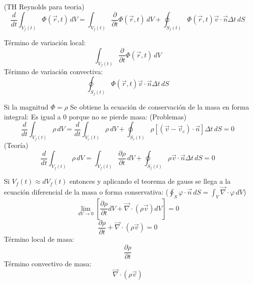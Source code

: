 (TH Reynolds para teoria)
\[\frac{d}{dt}\int_{V_f(t)} \Phi(\vec{r},t) \,dV=\int_{V_f(t)} \frac{\partial}{\partial t}\Phi(\vec{r},t) \,dV+\oint_{S_f(t)} \Phi(\vec{r},t)\vec{v}\cdot\vec{n}\Delta t \,dS\]

Término de variación local:
\[\int_{V_f(t)} \frac{\partial}{\partial t}\Phi(\vec{r},t) \,dV\]
Térimno de variación convectiva:
\[\oint_{S_f(t)} \Phi(\vec{r},t)\vec{v}\cdot\vec{n}\Delta t \,dS\]


Si la magnitud $\Phi = \rho$ Se obtiene la ecuación de conservación de la masa en forma integral:
Es igual a 0 porque no se pierde masa:
(Problemas)
\[\frac{d}{dt}\int_{V_f(t)}\rho\,dV=\frac{d}{dt}\int_{V_c(t)}\rho\,dV+\oint_{S_c(t)} \rho\left[(\vec{v}-\vec{v}_c)\cdot\vec{n}\right]\Delta t \,dS=0\]
(Teoría)
\[\frac{d}{dt}\int_{V_f(t)} \rho \,dV=\int_{V_f(t)} \frac{\partial \rho}{\partial t} \,dV+\oint_{S_f(t)} \rho\vec{v}\cdot\vec{n}\Delta t \,dS=0\]

Si $V_f(t)\approx dV_f(t)$ entonces y aplicando el teorema de gauss se llega a la ecuación diferencial de la masa o forma conservativa:
($\oint_S \varphi \cdot \vec{n}\,dS=\int_V \vec{\nabla}\cdot\varphi\,dV$)
\[\lim_{dV \to 0}\left[\frac{\partial \rho}{\partial t} dV+\vec{\nabla}\cdot\left(\rho\vec{v}\right)dV\right]=0\]
\[\frac{\partial \rho}{\partial t} +\vec{\nabla}\cdot\left(\rho\vec{v}\right)=0\]
Término local de masa: 
\[\frac{\partial \rho}{\partial t}\]
Término convectivo de masa:
\[\vec{\nabla}\cdot\left(\rho\vec{v}\right)\]
